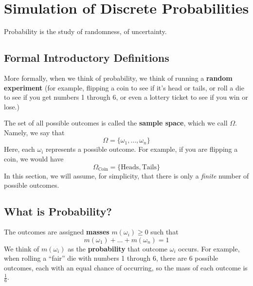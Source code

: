 \documentclass[letterpaper]{article}
\begin{document}
\section{Simulation of Discrete Probabilities}
Probability is the study of randomness, of uncertainty.

\subsection{Formal Introductory Definitions}
More formally, when we think of probability, we think of running a \textbf{random experiment} (for example, flipping a coin to see if it's head or tails, or roll a die to see if you get numbers 1 through 6, or even a lottery ticket to see if you win or lose.) 

\bigskip 

The set of all possible outcomes is called the \textbf{sample space}, which we call $\Omega$. Namely, we say that 
\[\Omega = \{\omega_1, \dots, \omega_n\}\]
Here, each $\omega_i$ represents a possible outcome. For example, if you are flipping a coin, we would have 
\[\Omega_{\text{Coin}} = \{\text{Heads}, \text{Tails}\}\]
In this section, we will assume, for simplicity, that there is only a \emph{finite} number of possible outcomes. 

\subsection{What is Probability?}
The outcomes are assigned \textbf{masses} $m(\omega_i) \geq 0$ such that 
\[m(\omega_1) + \dots + m(\omega_n) = 1\]
We think of $m(\omega_i)$ as the \textbf{probability} that outcome $\omega_i$ occurs. For example, when rolling a ``fair'' die with numbers 1 through 6, there are 6 possible outcomes, each with an equal chance of occurring, so the mass of each outcome is $\frac{1}{6}$. 
\end{document}
